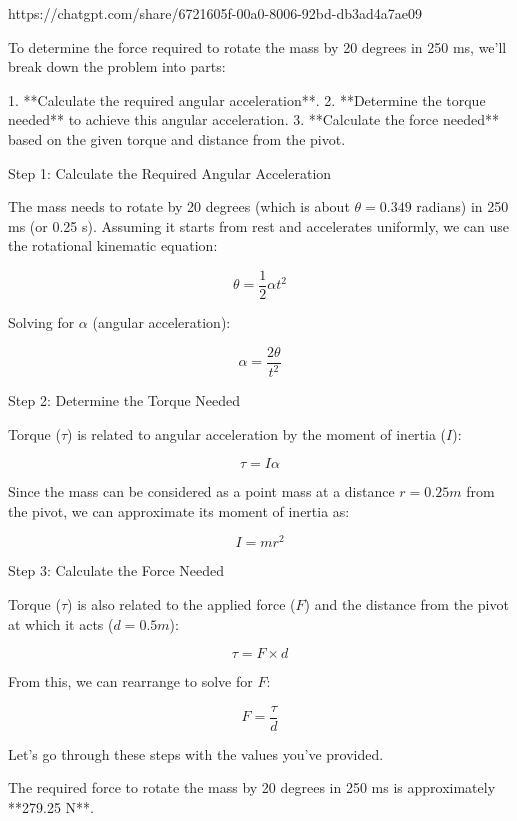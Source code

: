 \documentclass{article}
\begin{document}
https://chatgpt.com/share/6721605f-00a0-8006-92bd-db3ad4a7ae09

To determine the force required to rotate the mass by 20 degrees in 250 ms, we'll break down the problem into parts:

1. **Calculate the required angular acceleration**.
2. **Determine the torque needed** to achieve this angular acceleration.
3. **Calculate the force needed** based on the given torque and distance from the pivot.

Step 1: Calculate the Required Angular Acceleration

The mass needs to rotate by 20 degrees (which is about \( \theta = 0.349 \) radians) in 250 ms (or 0.25 s). Assuming it starts from rest and accelerates uniformly, we can use the rotational kinematic equation:

\[
\theta = \frac{1}{2} \alpha t^2
\]

Solving for \( \alpha \) (angular acceleration):

\[
\alpha = \frac{2\theta}{t^2}
\]

Step 2: Determine the Torque Needed

Torque (\( \tau \)) is related to angular acceleration by the moment of inertia (\( I \)):

\[
\tau = I \alpha
\]

Since the mass can be considered as a point mass at a distance \( r = 0.25 m \) from the pivot, we can approximate its moment of inertia as:

\[
I = m r^2
\]

Step 3: Calculate the Force Needed

Torque (\( \tau \)) is also related to the applied force (\( F \)) and the distance from the pivot at which it acts (\( d = 0.5 m \)):

\[
\tau = F \times d
\]

From this, we can rearrange to solve for \( F \):

\[
F = \frac{\tau}{d}
\]

Let’s go through these steps with the values you’ve provided.

The required force to rotate the mass by 20 degrees in 250 ms is approximately **279.25 N**.
\end{document}
